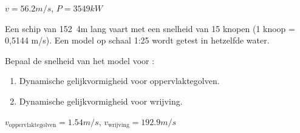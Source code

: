 	\begin{antwoord}
		$v = \unit{56.2}{m/s}$, $P = \unit{3549}{kW}$
	\end{antwoord}
\begin{toepassing*}
	\label{schip}
Een schip van \unit{152.4}{m} lang vaart met een snelheid van 15 knopen (1 knoop = 0,5144 m/s). Een model op schaal 1:25 wordt getest in hetzelfde water.

Bepaal de snelheid van het model voor :
	\begin{enumerate}
		\item Dynamische gelijkvormigheid voor oppervlaktegolven.
		\item Dynamische gelijkvormigheid voor wrijving.
	\end{enumerate}
\end{toepassing*}
\begin{antwoord}
	$v_{\text{oppervlaktegolven}} = \unit{1.54}{m/s}$, $v_{\text{wrijving}} = \unit{192.9}{m/s}$
\end{antwoord}
